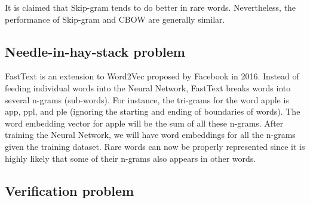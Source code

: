 It is claimed that Skip-gram tends to do better in rare words. Nevertheless, the performance of Skip-gram and CBOW are generally similar.

\subsection{Needle-in-hay-stack problem}

FastText is an extension to Word2Vec proposed by Facebook in 2016. Instead of feeding individual words into the Neural Network, FastText breaks words into several n-grams (sub-words). For instance, the tri-grams for the word apple is app, ppl, and ple (ignoring the starting and ending of boundaries of words). The word embedding vector for apple will be the sum of all these n-grams. After training the Neural Network, we will have word embeddings for all the n-grams given the training dataset. Rare words can now be properly represented since it is highly likely that some of their n-grams also appears in other words.\cite{word2vecFastText}

\subsection{Verification problem}

